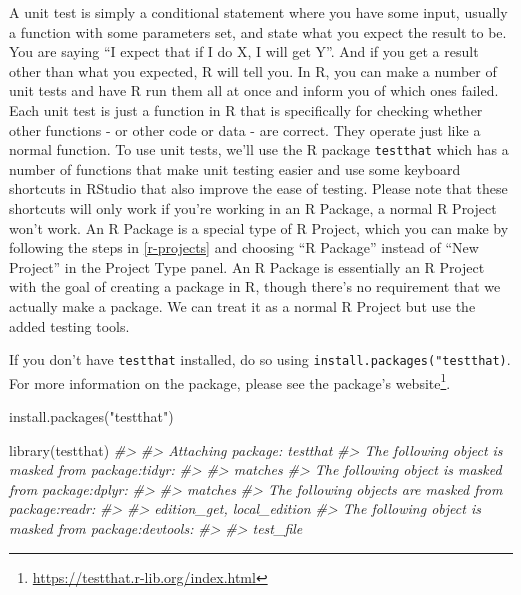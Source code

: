 \documentclass[
]{krantz}
\makeatletter
\newenvironment{Shaded}{\begin{snugshade}}{\end{snugshade}}
\newcommand{\CommentTok}[1]{\textcolor[rgb]{0.37,0.37,0.37}{\textit{#1}}}
\newcommand{\FunctionTok}[1]{\textcolor[rgb]{0,0,0}{#1}}
\newcommand{\NormalTok}[1]{#1}
\newcommand{\StringTok}[1]{\textcolor[rgb]{0.5,0.5,0.5}{#1}}
\renewcommand{\href}[2]{#2\footnote{\url{#1}}}
\newenvironment{kframe}{%
\medskip{}
\setlength{\fboxsep}{.8em}
 \def\at@end@of@kframe{}%
 \ifinner\ifhmode%
  \def\at@end@of@kframe{\end{minipage}}%
  \begin{minipage}{\columnwidth}%
 \fi\fi%
 \def\FrameCommand##1{\hskip\@totalleftmargin \hskip-\fboxsep
 \colorbox{shadecolor}{##1}\hskip-\fboxsep
     \hskip-\linewidth \hskip-\@totalleftmargin \hskip\columnwidth}%
 \MakeFramed {\advance\hsize-\width
   \@totalleftmargin\z@ \linewidth\hsize
   \@setminipage}}%
 {\par\unskip\endMakeFramed%
 \at@end@of@kframe}
\renewenvironment{Shaded}{\begin{kframe}}{\end{kframe}}
\makeatother
\begin{document}
A unit test is simply a conditional statement where you have some input, usually a function with some parameters set, and state what you expect the result to be. You are saying ``I expect that if I do X, I will get Y''. And if you get a result other than what you expected, R will tell you. In R, you can make a number of unit tests and have R run them all at once and inform you of which ones failed. Each unit test is just a function in R that is specifically for checking whether other functions - or other code or data - are correct. They operate just like a normal function. To use unit tests, we'll use the R package \texttt{testthat} which has a number of functions that make unit testing easier and use some keyboard shortcuts in RStudio that also improve the ease of testing. Please note that these shortcuts will only work if you're working in an R Package, a normal R Project won't work. An R Package is a special type of R Project, which you can make by following the steps in \ref{r-projects} and choosing ``R Package'' instead of ``New Project'' in the Project Type panel. An R Package is essentially an R Project with the goal of creating a package in R, though there's no requirement that we actually make a package. We can treat it as a normal R Project but use the added testing tools.

If you don't have \texttt{testthat} installed, do so using \texttt{install.packages("testthat)}. For more information on the package, please see the package's \href{https://testthat.r-lib.org/index.html}{website}.

\begin{Shaded}
\begin{Highlighting}[]
\FunctionTok{install.packages}\NormalTok{(}\StringTok{"testthat"}\NormalTok{)}
\end{Highlighting}
\end{Shaded}

\begin{Shaded}
\begin{Highlighting}[]
\FunctionTok{library}\NormalTok{(testthat)}
\CommentTok{\#\textgreater{} }
\CommentTok{\#\textgreater{} Attaching package: \textquotesingle{}testthat\textquotesingle{}}
\CommentTok{\#\textgreater{} The following object is masked from \textquotesingle{}package:tidyr\textquotesingle{}:}
\CommentTok{\#\textgreater{} }
\CommentTok{\#\textgreater{}     matches}
\CommentTok{\#\textgreater{} The following object is masked from \textquotesingle{}package:dplyr\textquotesingle{}:}
\CommentTok{\#\textgreater{} }
\CommentTok{\#\textgreater{}     matches}
\CommentTok{\#\textgreater{} The following objects are masked from \textquotesingle{}package:readr\textquotesingle{}:}
\CommentTok{\#\textgreater{} }
\CommentTok{\#\textgreater{}     edition\_get, local\_edition}
\CommentTok{\#\textgreater{} The following object is masked from \textquotesingle{}package:devtools\textquotesingle{}:}
\CommentTok{\#\textgreater{} }
\CommentTok{\#\textgreater{}     test\_file}
\end{Highlighting}
\end{Shaded}
\end{document}
